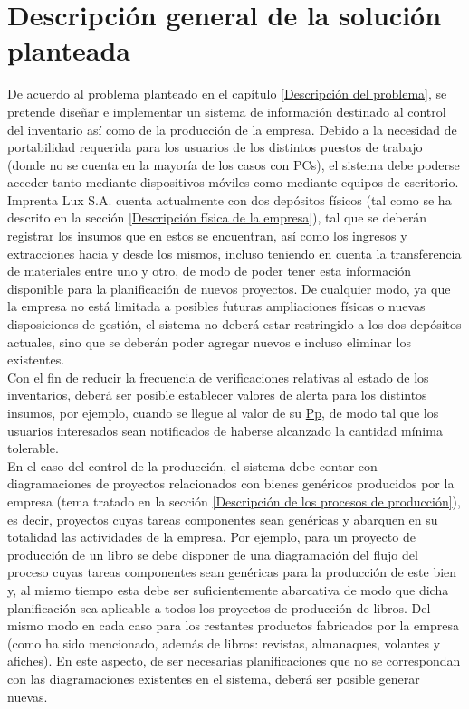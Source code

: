\documentclass[a4paper, 12pt,twoside]{report}  %
\numberwithin{equation}{subsection} %
\begin{document}
\section{Descripción general de la solución planteada}
De acuerdo al problema planteado en el capítulo \ref{Descripción del problema}, se pretende diseñar e implementar un sistema de información destinado al control del inventario así como de la producción de la empresa. Debido a la necesidad de portabilidad requerida para los usuarios de los distintos puestos de trabajo (donde no se cuenta en la mayoría de los casos con PCs), el sistema debe poderse acceder tanto mediante dispositivos móviles como mediante equipos de escritorio.\\
\indent Imprenta Lux S.A. cuenta actualmente con dos depósitos físicos (tal como se ha descrito en la sección \ref{Descripción física de la empresa}), tal que se deberán registrar los insumos que en estos se encuentran, así como los ingresos y extracciones hacia y desde los mismos, incluso teniendo en cuenta la transferencia de materiales entre uno y otro, de modo de poder tener esta información disponible para la planificación de nuevos proyectos. De cualquier modo,  ya que la empresa no está limitada a posibles futuras ampliaciones físicas o nuevas disposiciones de gestión, el sistema no deberá estar restringido a los dos depósitos actuales, sino que se deberán poder agregar nuevos e incluso eliminar los existentes.\\
\indent  Con el fin de reducir la frecuencia de verificaciones relativas al estado de los inventarios, deberá ser posible establecer valores de alerta para los distintos insumos, por ejemplo, cuando se llegue al valor de su \hyperlink{Pp}{Pp}, de modo tal que los usuarios interesados sean notificados de haberse alcanzado la cantidad mínima tolerable.\\
\indent En el caso del control de la producción, el sistema debe contar con diagramaciones de proyectos relacionados con bienes genéricos producidos por la empresa (tema tratado en la sección \ref{Descripción de los procesos de producción}), es decir, proyectos cuyas tareas componentes sean genéricas y abarquen en su totalidad las actividades de la empresa. Por ejemplo, para un proyecto de producción de un libro se debe disponer de una diagramación del flujo del proceso cuyas tareas componentes sean genéricas para la producción de este bien y, al mismo tiempo esta debe ser suficientemente abarcativa de modo que dicha planificación sea aplicable a todos los proyectos de producción de libros. Del mismo modo en cada caso para los restantes productos fabricados por la empresa (como ha sido mencionado, además de libros: revistas, almanaques, volantes y afiches). En este aspecto, de ser necesarias planificaciones que no se correspondan con las diagramaciones existentes en el sistema, deberá ser posible generar nuevas.\\
\end{document}

